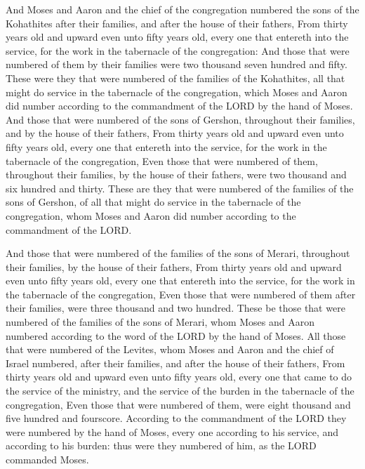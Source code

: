  And Moses and Aaron and the chief of the congregation
numbered the sons of the Kohathites after their families, and after the
house of their fathers,  From thirty years old and upward
even unto fifty years old, every one that entereth into the service, for
the work in the tabernacle of the congregation:  And
those that were numbered of them by their families were two thousand
seven hundred and fifty.  These were they that were
numbered of the families of the Kohathites, all that might do service in
the tabernacle of the congregation, which Moses and Aaron did number
according to the commandment of the LORD by the hand of Moses.
 And those that were numbered of the sons of Gershon,
throughout their families, and by the house of their fathers,
 From thirty years old and upward even unto fifty years
old, every one that entereth into the service, for the work in the
tabernacle of the congregation,  Even those that were
numbered of them, throughout their families, by the house of their
fathers, were two thousand and six hundred and thirty. 
These are they that were numbered of the families of the sons of
Gershon, of all that might do service in the tabernacle of the
congregation, whom Moses and Aaron did number according to the
commandment of the LORD.

 And those that were numbered of the families of the sons
of Merari, throughout their families, by the house of their fathers,
 From thirty years old and upward even unto fifty years
old, every one that entereth into the service, for the work in the
tabernacle of the congregation,  Even those that were
numbered of them after their families, were three thousand and two
hundred.  These be those that were numbered of the
families of the sons of Merari, whom Moses and Aaron numbered according
to the word of the LORD by the hand of Moses.  All those
that were numbered of the Levites, whom Moses and Aaron and the chief of
Israel numbered, after their families, and after the house of their
fathers,  From thirty years old and upward even unto
fifty years old, every one that came to do the service of the ministry,
and the service of the burden in the tabernacle of the congregation,
 Even those that were numbered of them, were eight
thousand and five hundred and fourscore.  According to
the commandment of the LORD they were numbered by the hand of Moses,
every one according to his service, and according to his burden: thus
were they numbered of him, as the LORD commanded Moses.

